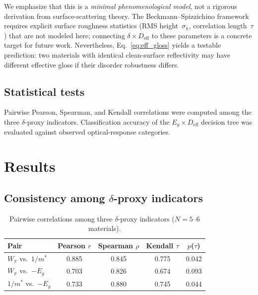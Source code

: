 \documentclass[twocolumn,showpacs,preprintnumbers,amsmath,amssymb,prb]{revtex4-2}
\begin{document}
We emphasize that
this is a \emph{minimal phenomenological model}, not a rigorous
derivation from surface-scattering theory.
The Beckmann--Spizzichino framework requires explicit surface
roughness statistics (RMS height~$\sigma_h$, correlation length~$\tau$)
that are not modeled here; connecting
$\delta \times D_\mathrm{eff}$ to these parameters is a concrete
target for future work.
Nevertheless, Eq.~\ref{eq:eff_gloss} yields a testable
prediction: two materials with identical clean-surface reflectivity
may have different effective gloss if their disorder robustness differs.

\subsection{Statistical tests}

Pairwise Pearson, Spearman, and Kendall correlations were computed among
the three $\delta$-proxy indicators. Classification accuracy of the
$E_g \times D_\mathrm{eff}$ decision tree was evaluated against observed
optical-response categories.

\section{Results}
\label{sec:results}

\subsection{Consistency among $\delta$-proxy indicators}

\begin{table}[h]
\caption{Pairwise correlations among three $\delta$-proxy indicators
  ($N = 5$--$6$ materials).}
\label{tab:correlations}
\begin{ruledtabular}
\begin{tabular}{lcccc}
  Pair & Pearson $r$ & Spearman $\rho$ & Kendall $\tau$ & $p$($\tau$) \\
  \hline
  $W_\pi$ vs.\ $1/m^*$ & 0.885 & 0.845 & 0.775 & 0.042 \\
  $W_\pi$ vs.\ $-E_g$ & 0.703 & 0.826 & 0.674 & 0.093 \\
  $1/m^*$ vs.\ $-E_g$ & 0.733 & 0.880 & 0.745 & 0.044 \\
\end{tabular}
\end{ruledtabular}
\end{table}
\end{document}
